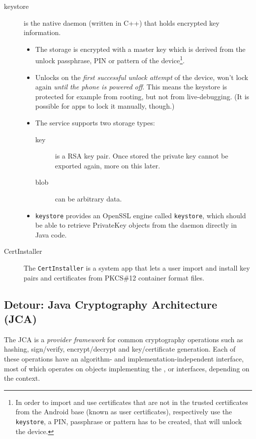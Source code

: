 \documentclass[a4paper,draft]{scrartcl}
\begin{document}
\begin{description}
		\item[keystore] is the native daemon (written in C++) that holds encrypted key information.
			\begin{itemize}
				\item The storage is encrypted with a master key which is derived from the unlock passphrase, PIN or pattern of the device\footnote{In order to import and use certificates that are not in the trusted certificates from the Android base (known as user certificates), respectively use the \texttt{keystore}, a PIN, passphrase or pattern has to be created, that will unlock the device.}.
				\item Unlocks on the \emph{first successful unlock attempt} of the device, won't lock again \emph{until the phone is powered off}. This means the keystore is protected for example from rooting, but not from live-debugging. (It is possible for apps to lock it manually, though.)
				\item The service supports two storage types:
				\begin{description}
					\item[key] is a RSA key pair. Once stored the private key cannot be exported again, more on this later.
					\item[blob] can be arbitrary data.
				\end{description}
				\item \texttt{keystore} provides an OpenSSL engine called \texttt{keystore}, which should be able to retrieve PrivateKey objects from the daemon directly in Java code.
			\end{itemize}
		\item [CertInstaller] The \texttt{CertInstaller} is a system app that lets a user import and install key pairs and certificates from PKCS\#12 container format files. %
	\end{description}

	\subsection*{Detour: Java Cryptography Architecture (JCA)}
		The JCA is a {\em provider framework} for common cryptography operations such as hashing, sign/verify, encrypt/decrypt and key/certificate generation. Each of these operations have an algorithm- and implementation-independent interface, most of which operates on objects implementing the ,  or  interfaces, depending on the context.
\end{document}
